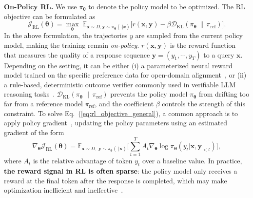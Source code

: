 \documentclass{article} %
\begin{document}
\textbf{On-Policy RL.} We use $\pi_{\boldsymbol{\theta}}$ to denote the policy model to be optimized. The RL objective can be formulated as
\begin{equation}
\label{eq:rl_objective_general}
\mathcal{J}_{\text{RL}}(\boldsymbol{\theta}) =  \max_{\boldsymbol{\theta}}\;
\mathbb{E}_{\boldsymbol{x} \sim D, \boldsymbol{y} \sim \pi_{\boldsymbol{\theta}}(\cdot|x)}\Big[
r(\boldsymbol{x},\boldsymbol{y}) - \beta \mathcal{D}_{\mathrm{KL}}(\pi_{\boldsymbol{\theta}}\,\|\, \pi_{\mathrm{ref}})
\Big].
\end{equation}
In the above formulation, the trajectories $y$ are sampled from the current policy model, making the training remain \textit{on-policy}. $r(\boldsymbol{x},\boldsymbol{y})$ is the reward function that measures the quality of a response sequence $\boldsymbol{y}=(y_1,\cdots, y_{T})$ to a query $\boldsymbol{x}$. Depending on the setting, it can be either (i) a parameterized neural reward model trained on the specific preference data for open-domain alignment~\citep{internlm2,rlhf-workflow,skywork-rm-v2}, or (ii) a rule-based, deterministic outcome verifier commonly used in verifiable LLM reasoning tasks~\citep{r1,orz,code-r1,deepcritic}. $\mathcal{D}_{\mathrm{KL}}(\pi_{\boldsymbol{\theta}} \,\|\, \pi_{\mathrm{ref}})$ prevents the policy model $\pi_{\boldsymbol{\theta}}$ from drifting too far from a reference model $\pi_{\mathrm{ref}}$, and the coefficient $\beta$ controls the strength of this constraint. To solve Eq.~(\ref{eq:rl_objective_general}), a common approach is to apply policy gradient~\citep{rl_introduction}, updating the policy parameters using an estimated gradient of the form
\begin{equation}
\label{eq:policy_gradient_general}
\nabla_{\boldsymbol{\theta}}\mathcal{J}_{\text{RL}}(\boldsymbol{\theta})
=
\mathbb{E}_{\boldsymbol{x}\sim D,\;\boldsymbol{y}\sim \pi_{\boldsymbol{\theta}}(\cdot | \boldsymbol{x})}
\Big[ \sum_{t=1}^{T}
A_{t} \nabla_{\boldsymbol{\theta}} \log \pi_{\boldsymbol{\theta}} (y_{t} | \boldsymbol{x},\boldsymbol{y}_{<t})
\Big],
\end{equation}
where $A_t$ is the relative advantage of token $y_t$ over a baseline value. In practice, \textbf{the reward signal in RL is often sparse}: the policy model only receives a reward at the final token after the response is completed, which may make optimization inefficient and ineffective~\citep{prime}.
\end{document}
